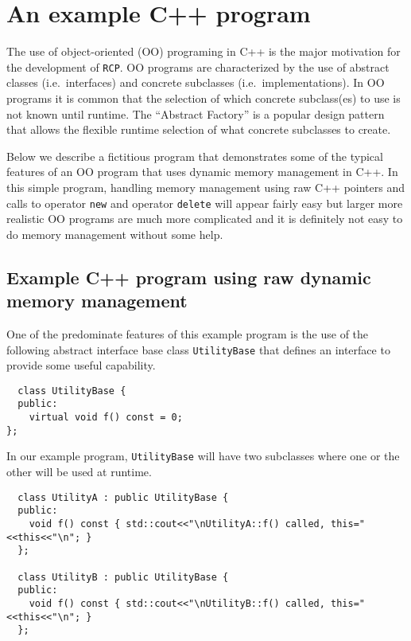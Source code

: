 \documentclass[pdf,ps2pdf,11pt]{SANDreport}
\begin{document}
%
\section{An example C++ program}
%

The use of object-oriented (OO) programing in C++ is the major
motivation for the development of {}\texttt{RCP}.  OO
programs are characterized by the use of abstract classes
(i.e.~interfaces) and concrete subclasses (i.e.~implementations).  In
OO programs it is common that the selection of which concrete
subclass(es) to use is not known until runtime.  The ``Abstract
Factory'' {}\cite{ref:gama_et_al_1995} is a popular design pattern
that allows the flexible runtime selection of what concrete subclasses
to create.

Below we describe a fictitious program that demonstrates some of the
typical features of an OO program that uses dynamic memory management
in C++.  In this simple program, handling memory management using raw
C++ pointers and calls to operator {}\texttt{new} and operator
{}\texttt{delete} will appear fairly easy but larger more realistic OO
programs are much more complicated and it is definitely not easy to do
memory management without some help.

%
\subsection{Example C++ program using raw dynamic memory management}
\label{rcpbg:sec:original-program}
%

One of the predominate features of this example program is the use of
the following abstract interface base class {}\texttt{Utility\-Base}
that defines an interface to provide some useful capability.

{\small\begin{verbatim}
  class UtilityBase {
  public:
    virtual void f() const = 0;
};
\end{verbatim}}

In our example program, {}\texttt{Utility\-Base} will have two
subclasses where one or the other will be used at runtime.

{\small\begin{verbatim}
  class UtilityA : public UtilityBase {
  public:
    void f() const { std::cout<<"\nUtilityA::f() called, this="<<this<<"\n"; }
  };
  
  class UtilityB : public UtilityBase {
  public:
    void f() const { std::cout<<"\nUtilityB::f() called, this="<<this<<"\n"; }
  };
\end{verbatim}}
\end{document}
